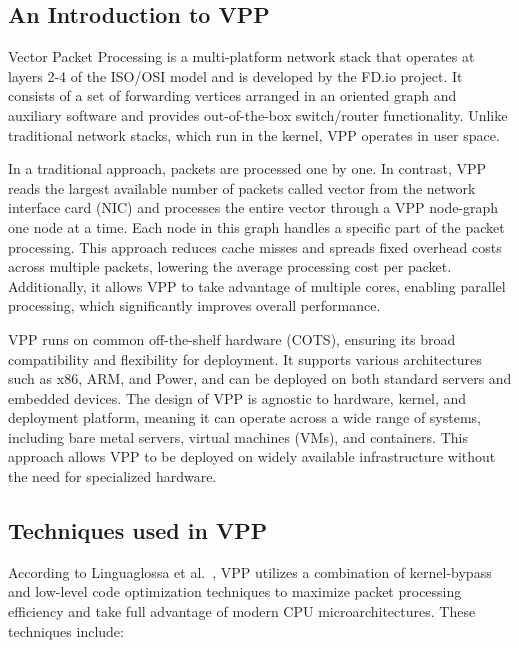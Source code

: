 \subsection{An Introduction to VPP}

Vector Packet Processing is a multi-platform network stack that operates at layers 2-4 of the ISO/OSI model and is developed by the FD.io project. 
It consists of a set of forwarding vertices arranged in an oriented graph and auxiliary software and provides out-of-the-box switch/router functionality.
Unlike traditional network stacks, which run in the kernel, VPP operates in user space.

In a traditional approach, packets are processed one by one. In contrast, VPP reads the largest available number of packets called vector from the network interface card (NIC) 
and processes the entire vector through a VPP node-graph one node at a time. Each node in this graph handles a specific part of the packet processing.
This approach reduces cache misses and spreads fixed overhead costs across multiple packets, lowering the average processing cost per packet. 
Additionally, it allows VPP to take advantage of multiple cores, enabling parallel processing, which significantly improves overall performance.

VPP runs on common off-the-shelf hardware (COTS), ensuring its broad compatibility and flexibility for deployment. 
It supports various architectures such as x86, ARM, and Power, and can be deployed on both standard servers and embedded devices. 
The design of VPP is agnostic to hardware, kernel, and deployment platform, meaning it can operate across a wide range of systems, including bare metal servers, virtual machines (VMs), and containers. 
This approach allows VPP to be deployed on widely available infrastructure without the need for specialized hardware.~\cite{fdio_what_is_vpp}

\subsection{Techniques used in VPP}
According to Linguaglossa et al.~\cite{LINGUAGLOSSA}, 
VPP utilizes a combination of kernel-bypass and low-level code optimization techniques to maximize packet processing efficiency and take full advantage of modern CPU microarchitectures.
These techniques include:

